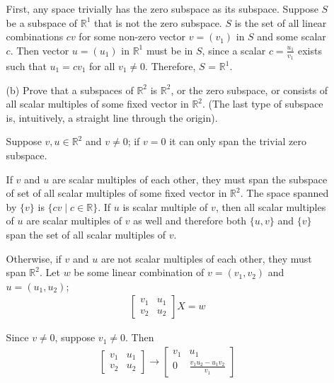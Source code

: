 \documentclass{article}
\begin{document}
\begin{enumerate}[listparindent=\parindent]
\begin{enumerate}[listparindent=\parindent]
            First, any space trivially has the zero subspace as its subspace.
            Suppose \(S\) be a subspace of \(\mathbb{R}^1\) that is not the zero subspace.
            \(S\) is the set of all linear combinations \(cv\) for some non-zero vector \(v = (v_1)\) in \(S\) and some scalar \(c\).
            Then vector \(u = (u_1)\) in \(\mathbb{R}^1\) must be in \(S\), since a scalar \(c = \frac{u_1}{v_1}\) exists
            such that \(u_1 = cv_1\) for all \(v_1 \neq 0\). Therefore, \(S\) = \(\mathbb{R}^1\).

        \item[(b)] Prove that a subspaces of \(\mathbb{R}^2\) is \(\mathbb{R}^2\), or the zero subspace,
            or consists of all scalar multiples of some fixed vector in \(\mathbb{R}^2\).
            (The last type of subspace is, intuitively, a straight line through the origin).
            
            Suppose \(v, u \in \mathbb{R}^2\) and \(v \neq 0\); if \(v = 0\) it can only span the trivial zero subspace.

            If \(v\) and \(u\) are scalar multiples of each other, they must span the subspace of
            set of all scalar multiples of some fixed vector in \(\mathbb{R}^2\).
            The space spanned by \(\{v\}\) is \(\{cv \mid c \in \mathbb{R}\}\).
            If \(u\) is scalar multiple of \(v\), then all scalar multiples of \(u\) are scalar multiples of \(v\) as well
            and therefore both \(\{u, v\}\) and \(\{v\}\) span the set of all scalar multiples of \(v\).

            Otherwise, if \(v\) and \(u\) are not scalar multiples of each other, they must span \(\mathbb{R}^2\).
            Let \(w\) be some linear combination of \(v = (v_1, v_2)\) and \(u = (u_1, u_2)\);
            \begin{gather*}
                \begin{bmatrix}
                    v_1 & u_1 \\
                    v_2 & u_2
                \end{bmatrix}
                X
                =
                w
            \end{gather*}

            Since \(v \neq 0\), suppose \(v_1 \neq 0\). Then
            \begin{gather*}
                \begin{bmatrix}
                    v_1 & u_1 \\
                    v_2 & u_2
                \end{bmatrix}
                \rightarrow
                \begin{bmatrix}
                    v_1 & u_1 \\
                    0 & \frac{v_1u_2 - u_1v_2}{v_1}
                \end{bmatrix}
            \end{gather*}


\end{enumerate}
\end{enumerate}
\end{document}
